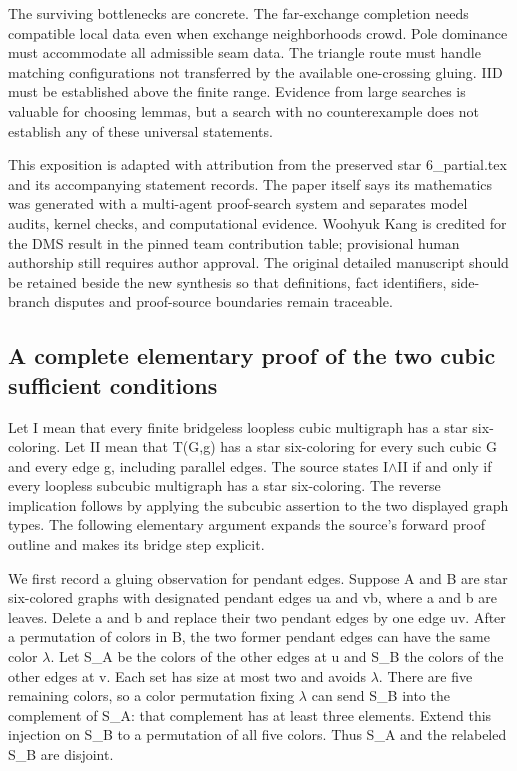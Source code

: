 \documentclass[11pt,a4paper]{article}
\begin{document}
The surviving bottlenecks are concrete. The far-exchange completion needs compatible local data even when exchange neighborhoods crowd. Pole dominance must accommodate all admissible seam data. The triangle route must handle matching configurations not transferred by the available one-crossing gluing. IID must be established above the finite range. Evidence from large searches is valuable for choosing lemmas, but a search with no counterexample does not establish any of these universal statements.

This exposition is adapted with attribution from the preserved star 6\_partial.tex and its accompanying statement records. The paper itself says its mathematics was generated with a multi-agent proof-search system and separates model audits, kernel checks, and computational evidence. Woohyuk Kang is credited for the DMS result in the pinned team contribution table; provisional human authorship still requires author approval. The original detailed manuscript should be retained beside the new synthesis so that definitions, fact identifiers, side-branch disputes and proof-source boundaries remain traceable.

\subsection{A complete elementary proof of the two cubic sufficient conditions}
Let I mean that every finite bridgeless loopless cubic multigraph has a star six-coloring. Let II mean that T(G,g) has a star six-coloring for every such cubic G and every edge g, including parallel edges. The source states I\ensuremath{\wedge}II if and only if every loopless subcubic multigraph has a star six-coloring. The reverse implication follows by applying the subcubic assertion to the two displayed graph types. The following elementary argument expands the source's forward proof outline and makes its bridge step explicit.

We first record a gluing observation for pendant edges. Suppose A and B are star six-colored graphs with designated pendant edges ua and vb, where a and b are leaves. Delete a and b and replace their two pendant edges by one edge uv. After a permutation of colors in B, the two former pendant edges can have the same color \ensuremath{\lambda}. Let S\_A be the colors of the other edges at u and S\_B the colors of the other edges at v. Each set has size at most two and avoids \ensuremath{\lambda}. There are five remaining colors, so a color permutation fixing \ensuremath{\lambda} can send S\_B into the complement of S\_A: that complement has at least three elements. Extend this injection on S\_B to a permutation of all five colors. Thus S\_A and the relabeled S\_B are disjoint.
\end{document}
